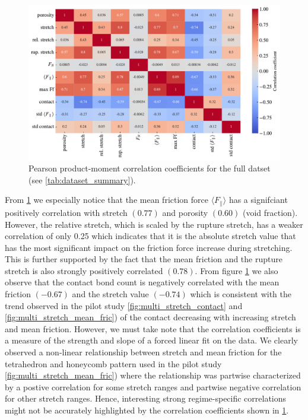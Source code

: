 \begin{figure}[H]
  \centering
  \includegraphics[width=\linewidth]{figures/ML/corrcoef_matrix.pdf}
  \caption{Pearson product-moment correlation coefficients for the full datset (see \cref{tab:dataset_summary}).}
  \label{fig:corrcoef_matrix}
\end{figure}

From \cref{fig:corrcoef_matrix} we especially notice that the mean
friction force $\langle F_{\parallel} \rangle$ has a signifciant positively
correlation with stretch $(0.77)$ and porosity $(0.60)$ (void fraction).
However, the relative stretch, which is scaled by the rupture stretch, has a
weaker correlation of only 0.25 which indicates that it is the absolute stretch
value that has the most significant impact on the friction force increase during
stretching. This is further supported by the fact that the mean friction and the
rupture stretch is also strongly positively correlated $(0.78)$. From figure
\cref{fig:corrcoef_matrix} we also observe that the contact bond count is
negatively correlated with the mean friction $(-0.67)$ and the stretch value
$(-0.74)$ which is consistent with the trend observed in the pilot study  \cref{fig:multi_stretch_contact} and \cref{fig:multi_stretch_mean_fric}) of the
contact decreasing with increasing stretch and mean friction. However, we must
take note that the correlation coefficients is a measure of the strength and slope of a
forced linear fit on the data. We clearly observed a non-linear relationship between stretch and mean friction for the tetrahedron and honeycomb pattern used in the pilot study  \cref{fig:multi_stretch_mean_fric}) where the relationship was partwise characterized by a postive correlation for some stretch ranges and partwise negative correlation for other stretch ranges. Hence, interesting strong regime-specific correlations might not be accurately highlighted by the correlation coefficients shown in \cref{fig:corrcoef_matrix}.


